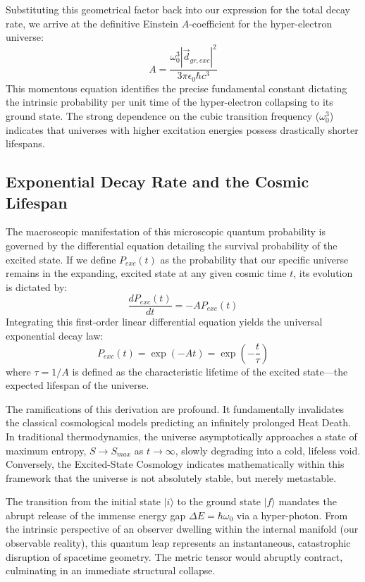 Substituting this geometrical factor back into our expression for the total decay rate, we arrive at the definitive Einstein $A$-coefficient for the hyper-electron universe:
\begin{equation}
    A = \frac{\omega_0^3 |\vec{d}_{gr, exc}|^2}{3 \pi \epsilon_0 \hbar c^3}
\end{equation}
This momentous equation identifies the precise fundamental constant dictating the intrinsic probability per unit time of the hyper-electron collapsing to its ground state. The strong dependence on the cubic transition frequency ($\omega_0^3$) indicates that universes with higher excitation energies possess drastically shorter lifespans.

\subsection{Exponential Decay Rate and the Cosmic Lifespan}
The macroscopic manifestation of this microscopic quantum probability is governed by the differential equation detailing the survival probability of the excited state. If we define $P_{exc}(t)$ as the probability that our specific universe remains in the expanding, excited state at any given cosmic time $t$, its evolution is dictated by:
\begin{equation}
    \frac{dP_{exc}(t)}{dt} = -A P_{exc}(t)
\end{equation}
Integrating this first-order linear differential equation yields the universal exponential decay law:
\begin{equation}
    P_{exc}(t) = \exp(-A t) = \exp\left(-\frac{t}{\tau}\right)
\end{equation}
where $\tau = 1/A$ is defined as the characteristic lifetime of the excited state---the expected lifespan of the universe. 

The ramifications of this derivation are profound. It fundamentally invalidates the classical cosmological models predicting an infinitely prolonged Heat Death. In traditional thermodynamics, the universe asymptotically approaches a state of maximum entropy, $S \to S_{max}$ as $t \to \infty$, slowly degrading into a cold, lifeless void. Conversely, the Excited-State Cosmology indicates mathematically within this framework that the universe is not absolutely stable, but merely metastable.

The transition from the initial state $|i\rangle$ to the ground state $|f\rangle$ mandates the abrupt release of the immense energy gap $\Delta E = \hbar \omega_0$ via a hyper-photon. From the intrinsic perspective of an observer dwelling within the internal manifold (our observable reality), this quantum leap represents an instantaneous, catastrophic disruption of spacetime geometry. The metric tensor would abruptly contract, culminating in an immediate structural collapse. 

